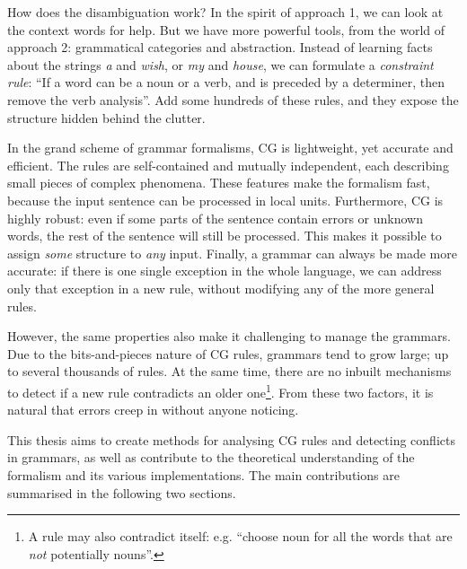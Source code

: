 How does the disambiguation work?
In the spirit of approach 1, we can look at the context words for help. 
But we have more powerful tools, from the world of approach 2: grammatical categories and abstraction.
Instead of learning facts about the strings \emph{a} and \emph{wish}, or \emph{my} and \emph{house}, we can formulate a \emph{constraint rule}: ``If a word can be a noun or a verb, and is preceded by a determiner, then remove the verb analysis''. 
Add some hundreds of these rules, and they expose the structure hidden behind the clutter.

In the grand scheme of grammar formalisms, CG is lightweight, yet accurate and efficient. The rules are self-contained and mutually independent, each describing small pieces of complex phenomena. %
These features make the formalism fast, because the input sentence can be processed in local units. Furthermore, CG is highly robust: even if some parts of the sentence contain errors or unknown words, the rest of the sentence will still be processed.
This makes it possible to assign \emph{some} structure to \emph{any} input.
Finally, a grammar can always be made more accurate: if there is one single exception in the whole language, we can address only that exception in a new rule, without modifying any of the more general rules.

However, the same properties also make it challenging to manage the grammars.
Due to the bits-and-pieces nature of CG rules, grammars tend to grow large;
up to several thousands of rules. At the same time, there are no inbuilt 
mechanisms to detect if a new rule contradicts an older one\footnote{A rule may also contradict itself: e.g. ``choose noun for all the words that are \emph{not} potentially nouns''.}.
From these two factors, it is natural that errors creep in without anyone noticing.

This thesis aims to create methods for analysing CG rules and detecting conflicts in grammars, as well as contribute to the theoretical understanding of the formalism and its various implementations.
The main contributions are summarised in the following two sections.



